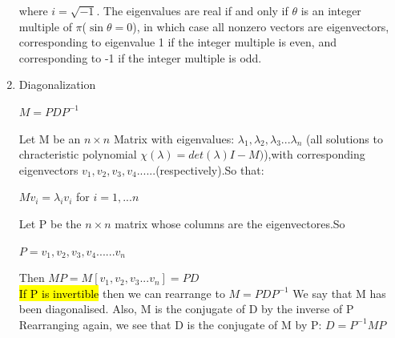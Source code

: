\documentclass{article}
\begin{document}
\begin{enumerate}
    where $i=\sqrt{-1}$. The eigenvalues are real if and only if $\theta$ is an integer multiple of $\pi$($\sin \theta = 0$), in which case all nonzero vectors are eigenvectors, corresponding to eigenvalue 1 if the integer multiple is even, and corresponding to -1 if the integer multiple is odd.

    \item Diagonalization
    \begin{center}
        $M = PDP^{-1}$
    \end{center}
    Let M be an $n \times n$ Matrix with eigenvalues: $\lambda_1,\lambda_2,\lambda_3...\lambda_n$ (all solutions to chracteristic polynomial $ \chi (\lambda) = det(\lambda) I -M)$),with corresponding eigenvectors $v_1,v_2,v_3,v_4......$(respectively).So that:
    \begin{center}
        $Mv_i = \lambda_i v_i$ for $i = 1, ... n$
    \end{center}
    Let P be the $n \times n$ matrix whose columns are the eigenvectores.So
    \begin{center}
        $P = v_1,v_2,v_3,v_4......v_n$
    \end{center}
    Then $MP = M[v_1,v_2,v_3...v_n] = PD$\\
    \hl{If P is invertible} then we can rearrange to $M = PDP^{-1}$
    We say that M has been diagonalised. Also, M is the conjugate of D by the inverse of P
    Rearranging again, we see that D is the conjugate of M by P: $D = P^{-1}MP$
\end{enumerate}
\end{document}

